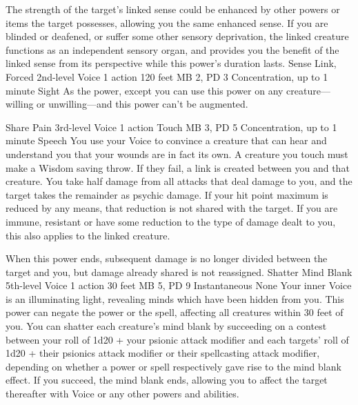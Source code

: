 The strength of the target's linked sense could be enhanced
by other powers or items the target possesses, allowing you
the same enhanced sense. If you are blinded or deafened, or
suffer some other sensory deprivation, the linked creature
functions as an independent sensory organ, and provides you
the benefit of the linked sense from its perspective while
this power's duration lasts.
\DndPowerHeader%
    {Sense Link, Forced\label{pwr:sense_link_forced}}
    {2nd-level Voice}
    {1 action}
    {120 feet}
    {MB 2, PD 3}
    {Concentration, up to 1 minute}
    {Sight}
As the  power, except you
can use this power on any creature---willing or unwilling---and
this power can't be augmented.

\DndPowerHeader%
    {Share Pain\label{pwr:share_pain}}
    {3rd-level Voice}
    {1 action}
    {Touch}
    {MB 3, PD 5}
    {Concentration, up to 1 minute}
    {Speech}
You use your Voice to convince a creature
that can hear and understand you
that your wounds are in fact its own. A creature you touch
must make a Wisdom saving throw. If they fail, a link is created
between you and that creature. You take half damage from all
attacks that deal damage to you, and the target takes the
remainder as psychic damage. If your hit point maximum is
reduced by any means, that reduction is not shared with the
target. If you are immune, resistant or have some reduction
to the type of damage dealt to you, this also applies to the
linked creature.

When this power ends, subsequent damage is no longer divided
between the target and you, but damage already shared is not
reassigned.
\DndPowerHeader%
    {Shatter Mind Blank\label{pwr:shatter_mind_blank}}
    {5th-level Voice}
    {1 action}
    {30 feet}
    {MB 5, PD 9}
    {Instantaneous}
    {None}
Your inner Voice is an illuminating light, revealing
minds which have been hidden from you. This power can negate
the  power or the 
spell, affecting all creatures within 30 feet of you. You
can shatter each creature's mind blank by succeeding on a
contest between your roll of 1d20 + your psionic attack modifier
and each targets' roll of 1d20 + their psionics attack modifier
or their spellcasting attack modifier, depending on whether
a power or spell respectively gave rise to the mind blank
effect. If you succeed, the mind blank ends, allowing
you to affect the target thereafter with Voice or any other
powers and abilities.

